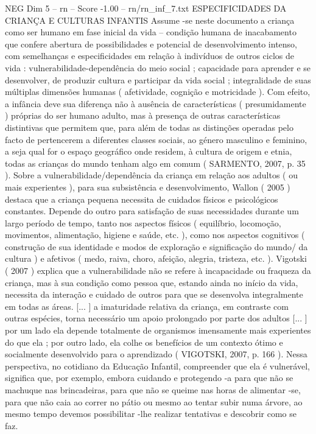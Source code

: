 \begin{textsample}{NEG Dim 5 – rn – Score -1.00 – rn/rn\_inf\_7.txt}  \label{ex:f5_neg_145}
ESPECIFICIDADES DA CRIANÇA E CULTURAS INFANTIS Assume -se neste documento a criança como ser humano em fase inicial da vida – condição humana de inacabamento que confere abertura de possibilidades e potencial de desenvolvimento intenso, com semelhanças e especificidades em relação à indivíduos de outros ciclos de vida : vulnerabilidade-dependência do meio social ; capacidade para aprender e se desenvolver, de produzir cultura e participar da vida social ; integralidade de suas múltiplas dimensões humanas ( afetividade, cognição e motricidade ).
Com efeito, a infância deve sua diferença não à ausência de características ( presumidamente ) próprias do ser humano adulto, mas à presença de outras características distintivas que permitem que, para além de todas as distinções operadas pelo facto de pertencerem a diferentes classes sociais, ao género masculino e feminino, a seja qual for o espaço geográfico onde residem, à cultura de origem e etnia, todas as crianças do mundo tenham algo em comum ( SARMENTO, 2007, p. 35 ).
Sobre a vulnerabilidade/dependência da criança em relação aos adultos ( ou mais experientes ), para sua subsistência e desenvolvimento, Wallon ( 2005 ) destaca que a criança pequena necessita de cuidados físicos e psicológicos constantes.
Depende do outro para satisfação de suas necessidades durante um largo período de tempo, tanto nos aspectos físicos ( equilíbrio, locomoção, movimentos, alimentação, higiene e saúde, etc. ), como nos aspectos cognitivos ( construção de sua identidade e modos de exploração e significação do mundo/ da cultura ) e afetivos ( medo, raiva, choro, afeição, alegria, tristeza, etc. ).
Vigotski ( 2007 ) explica que a vulnerabilidade não se refere à incapacidade ou fraqueza da criança, mas à sua condição como pessoa que, estando ainda no início da vida, necessita da interação e cuidado de outros para que se desenvolva integralmente em todas as áreas. [... ] a imaturidade relativa da criança, em contraste com outras espécies, torna necessário um apoio prolongado por parte dos adultos [... ] por um lado ela depende totalmente de organismos imensamente mais experientes do que ela ; por outro lado, ela colhe os benefícios de um contexto ótimo e socialmente desenvolvido para o aprendizado ( VIGOTSKI, 2007, p. 166 ).
Nessa perspectiva, no cotidiano da Educação Infantil, compreender que ela é vulnerável, significa que, por exemplo, embora cuidando e protegendo -a para que não se machuque nas brincadeiras, para que não se queime nas horas de alimentar -se, para que não caia ao correr no pátio ou mesmo ao tentar subir numa árvore, ao mesmo tempo devemos possibilitar -lhe realizar tentativas e descobrir como se faz.

\end{textsample}
